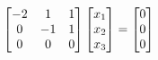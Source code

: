 \documentclass[preview]{standalone}
\begin{document}
\begin{align*}
\special{dvisvgm:raw <g id='unique000'>}\begin{bmatrix} -2 & 1 & 1 \\ 0 & -1 & 1 \\ 0 & 0 & 0 \end{bmatrix} \begin{bmatrix} x_1 \\ x_2 \\ x_3 \end{bmatrix} = \begin{bmatrix} 0 \\ 0 \\ 0 \end{bmatrix}\special{dvisvgm:raw </g>}
\end{align*}
\end{document}
